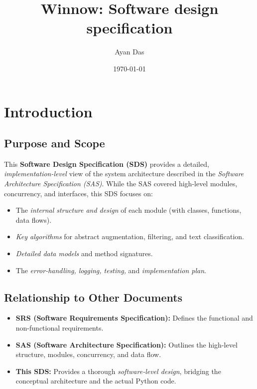 \documentclass[12pt]{article}
\title{Winnow: Software design specification}
\author{Ayan Das}
\date{\today}
\begin{document}
\maketitle
\tableofcontents

\section{Introduction}

\subsection{Purpose and Scope}
This \textbf{Software Design Specification (SDS)} provides a detailed, \emph{implementation-level} view of the system architecture described in the \emph{Software Architecture Specification (SAS)}. While the SAS covered high-level modules, concurrency, and interfaces, this SDS focuses on:

\begin{itemize}
  \item The \emph{internal structure and design} of each module (with classes, functions, data flows).
  \item \emph{Key algorithms} for abstract augmentation, filtering, and text classification.
  \item \emph{Detailed data models} and method signatures.
  \item The \emph{error-handling, logging, testing,} and \emph{implementation plan}.
\end{itemize}

\subsection{Relationship to Other Documents}
\begin{itemize}
  \item \textbf{SRS (Software Requirements Specification):} Defines the functional and non-functional requirements.
  \item \textbf{SAS (Software Architecture Specification):} Outlines the high-level structure, modules, concurrency, and data flow. 
  \item \textbf{This SDS:} Provides a thorough \emph{software-level design}, bridging the conceptual architecture and the actual Python code.
\end{itemize}
\end{document}
